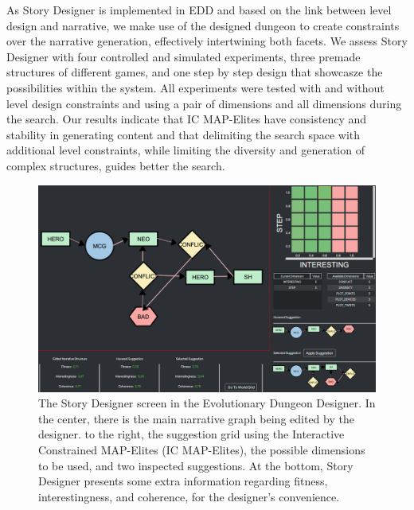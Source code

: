 As Story Designer is implemented in EDD and based on the link between level design and narrative, we make use of the designed dungeon to create constraints over the narrative generation, effectively intertwining both facets. We assess Story Designer with four controlled and simulated experiments, three premade structures of different games, and one step by step design that showcasze the possibilities within the system. All experiments were tested with and without level design constraints and using a pair of dimensions and all dimensions during the search. Our results indicate that IC MAP-Elites have consistency and stability in generating content and that delimiting the search space with additional level constraints, while limiting the diversity and generation of complex structures, guides better the search.

\begin{figure}[t]
\centering
  \includegraphics[width=\textwidth]{figures/current_GUI_fixed.png}
\caption{The Story Designer screen in the Evolutionary Dungeon Designer. In the center, there is the main narrative graph being edited by the designer. to the right, the suggestion grid using the Interactive Constrained MAP-Elites (IC MAP-Elites), the possible dimensions to be used, and two inspected suggestions. At the bottom, Story Designer presents some extra information regarding fitness, interestingness, and coherence, for the designer's convenience.}
    \label{fig:story-screen}
\end{figure}